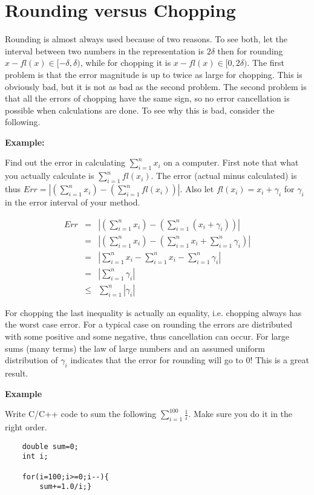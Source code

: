 \section{Rounding versus Chopping}

Rounding is almost always used because of two reasons.  To see both, let the interval between two numbers in the representation is $2\delta$ then for rounding $x-fl(x)\in [-\delta,\delta)$, while for chopping it is $x-fl(x)\in [0,2\delta)$.  The first problem is that the error magnitude is up to twice as large for chopping.  This is obviously bad, but it is not as bad as the second problem.  The second problem is that all the errors of chopping have the same sign, so no error cancellation is possible when calculations are done.  To see why this is bad, consider the following.

\vspace{.1in}\noindent
\textbf{Example:}

Find out the error in calculating $\sum_{i=1}^{n}x_i$ on a computer.  First note that what you actually calculate is $\sum_{i=1}^{n}fl(x_i)$.  The error (actual minus calculated) is thus $Err=\left|(\sum_{i=1}^{n}x_i)-(\sum_{i=1}^{n}fl(x_i))\right|$.  Also let $fl(x_i)=x_i+\gamma_i$ for $\gamma_i$ in the error interval of your method.

\begin{eqnarray*}
  Err &=& \left|(\sum_{i=1}^{n}x_i)-(\sum_{i=1}^{n}(x_i+\gamma_i))\right| \\
    &=& \left|(\sum_{i=1}^{n}x_i)-(\sum_{i=1}^{n}x_i+\sum_{i=1}^{n}\gamma_i)\right| \\
    &=& \left|\sum_{i=1}^{n}x_i-\sum_{i=1}^{n}x_i-\sum_{i=1}^{n}\gamma_i\right| \\
    &=& \left|\sum_{i=1}^{n}\gamma_i\right| \\
    &\leq & \sum_{i=1}^{n}\left|\gamma_i\right|
\end{eqnarray*}

For chopping the last inequality is actually an equality, i.e. chopping always has the worst case error.  For a typical case on rounding the errors are distributed with some positive and some negative, thus cancellation can occur.  For large sums (many terms) the law of large numbers and an assumed uniform distribution of $\gamma_i$ indicates that the error for rounding will go to $0$!  This is a great result.

\vspace{.1in}\noindent
\textbf{Example}

Write C/C++ code to sum the following $\sum_{i=1}^{100}\frac{1}{i}$.  Make sure you do it in the right order.
    {\color{ans}

    \begin{verbatim}
    double sum=0;
    int i;

    for(i=100;i>=0;i--){
        sum+=1.0/i;}
    \end{verbatim}


    }

